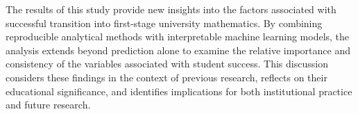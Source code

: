 The results of this study provide new insights into the factors associated with successful transition into first-stage university mathematics. By combining reproducible analytical methods with interpretable machine learning models, the analysis extends beyond prediction alone to examine the relative importance and consistency of the variables associated with student success. This discussion considers these findings in the context of previous research, reflects on their educational significance, and identifies implications for both institutional practice and future research.
